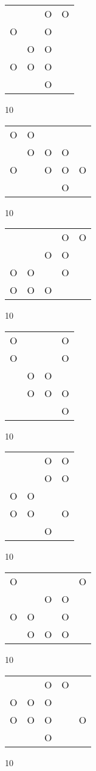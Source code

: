 \begin{tabular}{|m{0.2cm}m{0.2cm}m{0.2cm}m{0.2cm}|}\hline
 & &O&O\\
O& &O& \\
 &O&O& \\
O&O&O& \\
 & &O& \\
\hline\end{tabular}10
\begin{tabular}{|m{0.2cm}m{0.2cm}m{0.2cm}m{0.2cm}m{0.2cm}|}\hline
O&O& & & \\
 &O&O&O& \\
O& &O&O&O\\
 & & &O& \\
\hline\end{tabular}10
\begin{tabular}{|m{0.2cm}m{0.2cm}m{0.2cm}m{0.2cm}m{0.2cm}|}\hline
 & & &O&O\\
 & &O&O& \\
O&O& &O& \\
O&O&O& & \\
\hline\end{tabular}10
\begin{tabular}{|m{0.2cm}m{0.2cm}m{0.2cm}m{0.2cm}|}\hline
O& & &O\\
O& & &O\\
 &O&O& \\
 &O&O&O\\
 & & &O\\
\hline\end{tabular}10
\begin{tabular}{|m{0.2cm}m{0.2cm}m{0.2cm}m{0.2cm}|}\hline
 & &O&O\\
 & &O&O\\
O&O& & \\
O&O& &O\\
 & &O& \\
\hline\end{tabular}10
\begin{tabular}{|m{0.2cm}m{0.2cm}m{0.2cm}m{0.2cm}m{0.2cm}|}\hline
O& & & &O\\
 & &O&O& \\
O&O& &O& \\
 &O&O&O& \\
\hline\end{tabular}10
\begin{tabular}{|m{0.2cm}m{0.2cm}m{0.2cm}m{0.2cm}m{0.2cm}|}\hline
 & &O&O& \\
O&O&O& & \\
O&O&O& &O\\
 & &O& & \\
\hline\end{tabular}10
